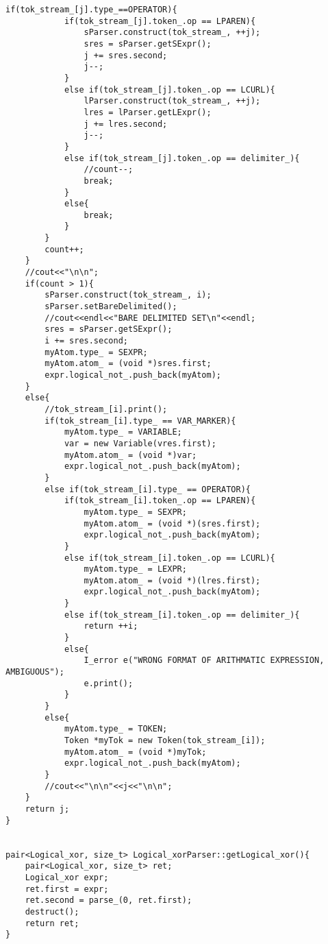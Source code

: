 \documentclass[pdftex,12pt,letterpaper,notitlepage,twoside]{article}
\begin{document}
\begin{lstlisting}[frame=single,caption={C program for testing}]
        if(tok_stream_[j].type_==OPERATOR){
            if(tok_stream_[j].token_.op == LPAREN){
                sParser.construct(tok_stream_, ++j);
                sres = sParser.getSExpr();
                j += sres.second;
                j--;
            }
            else if(tok_stream_[j].token_.op == LCURL){
                lParser.construct(tok_stream_, ++j);
                lres = lParser.getLExpr();
                j += lres.second;
                j--;
            }
            else if(tok_stream_[j].token_.op == delimiter_){
                //count--;
                break;
            }
            else{
                break;
            }
        }
        count++;
    }
    //cout<<"\n\n";
    if(count > 1){
        sParser.construct(tok_stream_, i);
        sParser.setBareDelimited();
        //cout<<endl<<"BARE DELIMITED SET\n"<<endl;
        sres = sParser.getSExpr();
        i += sres.second;
        myAtom.type_ = SEXPR;
        myAtom.atom_ = (void *)sres.first;
        expr.logical_not_.push_back(myAtom);
    }
    else{
        //tok_stream_[i].print();
        if(tok_stream_[i].type_ == VAR_MARKER){
            myAtom.type_ = VARIABLE;
            var = new Variable(vres.first);
            myAtom.atom_ = (void *)var;
            expr.logical_not_.push_back(myAtom);
        }
        else if(tok_stream_[i].type_ == OPERATOR){
            if(tok_stream_[i].token_.op == LPAREN){
                myAtom.type_ = SEXPR;
                myAtom.atom_ = (void *)(sres.first);
                expr.logical_not_.push_back(myAtom);
            }
            else if(tok_stream_[i].token_.op == LCURL){
                myAtom.type_ = LEXPR;
                myAtom.atom_ = (void *)(lres.first);
                expr.logical_not_.push_back(myAtom);
            }
            else if(tok_stream_[i].token_.op == delimiter_){
                return ++i;
            }
            else{
                I_error e("WRONG FORMAT OF ARITHMATIC EXPRESSION, AMBIGUOUS");
                e.print();
            }
        }
        else{
            myAtom.type_ = TOKEN;
            Token *myTok = new Token(tok_stream_[i]);
            myAtom.atom_ = (void *)myTok;
            expr.logical_not_.push_back(myAtom);
        }
        //cout<<"\n\n"<<j<<"\n\n";
    }
    return j;
}


pair<Logical_xor, size_t> Logical_xorParser::getLogical_xor(){
    pair<Logical_xor, size_t> ret;
    Logical_xor expr;
    ret.first = expr;
    ret.second = parse_(0, ret.first);
    destruct();
    return ret;
}


\end{lstlisting}
\end{document}
